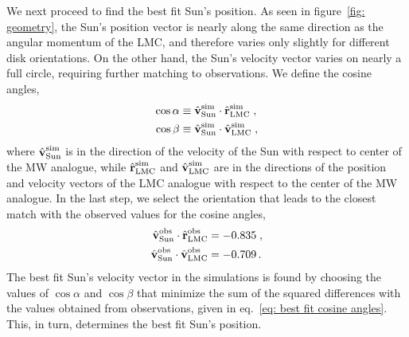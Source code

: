 We next proceed to find the best fit Sun's position. As seen in figure~\ref{fig: geometry}, 
the Sun's position vector is nearly along the same direction as the angular momentum of the LMC, and therefore varies only slightly for different disk orientations. On the other hand, the Sun's velocity vector varies on nearly a full circle, requiring further matching to observations. We define the cosine angles, 
\begin{align}
   \cos\alpha &\equiv \hat{\textbf{v}}_{\rm Sun}^{\rm sim} \cdot \hat{\textbf{r}}_{\rm LMC}^{\rm sim}\; , \nonumber \\ 
    \cos\beta &\equiv  \hat{\textbf{v}}_{\rm Sun}^{\rm sim} \cdot \hat{\textbf{v}}_{\rm LMC}^{\rm sim} \; ,
    \label{eq: cosine angles}
\end{align}
where $\hat{\textbf{v}}_{\rm Sun}^{\rm sim}$ is in the direction of the velocity of the Sun with respect to center of the MW analogue, while $\hat{\textbf{r}}_{\rm LMC}^{\rm sim}$ and $\hat{\textbf{v}}_{\rm LMC}^{\rm sim}$ are in the directions of the position and velocity vectors of the LMC analogue with respect to the center of the MW analogue. 
In the last step, we select the orientation that leads to the closest match with the observed values for the cosine angles,
\begin{align}
    \hat{\textbf{v}}_{\rm Sun}^{\rm obs} \cdot \hat{\textbf{r}}_{\rm LMC}^{\rm obs} &= -0.835\; , \nonumber\\
    \hat{\textbf{v}}_{\rm Sun}^{\rm obs} \cdot \hat{\textbf{v}}_{\rm LMC}^{\rm obs} &= -0.709 \, . 
    \label{eq: best fit cosine angles}
\end{align}
The best fit Sun's velocity vector in the simulations is found by choosing the values of $\cos\alpha$ and $\cos\beta$  that minimize the sum of the squared differences with the values obtained from observations, given in eq.~\eqref{eq: best fit cosine angles}. This, in turn, determines the best fit Sun's position.





